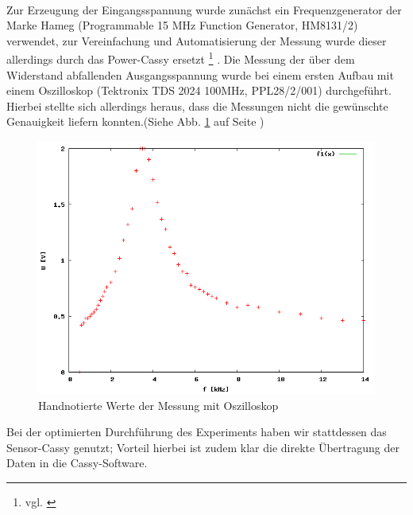 \paragraph{}
Zur Erzeugung der Eingangsspannung wurde zunächst ein Frequenzgenerator der Marke Hameg (Programmable 15 MHz Function Generator, HM8131/2) verwendet, zur Vereinfachung und Automatisierung der Messung wurde dieser allerdings durch das Power-Cassy ersetzt \footnote{vgl. \cite[42f.]{cassy2013manual}} .
Die Messung der über dem Widerstand abfallenden Ausgangsspannung wurde bei einem ersten Aufbau mit einem Oszilloskop (Tektronix TDS 2024 100MHz, PPL28/2/001) durchgeführt. Hierbei stellte sich allerdings heraus, dass die Messungen nicht die gewünschte Genauigkeit liefern konnten.(Siehe Abb. \ref{plot:oszi} auf Seite \pageref{plot:oszi})
\begin{figure}
	\includegraphics[width=.9\textwidth]{images/plot/oszi.png}
\caption{Handnotierte Werte der Messung mit Oszilloskop}
\label{plot:oszi}
\end{figure}
Bei der optimierten Durchführung des Experiments haben wir stattdessen das Sensor-Cassy genutzt; Vorteil hierbei ist zudem klar die direkte Übertragung der Daten in die Cassy-Software.

